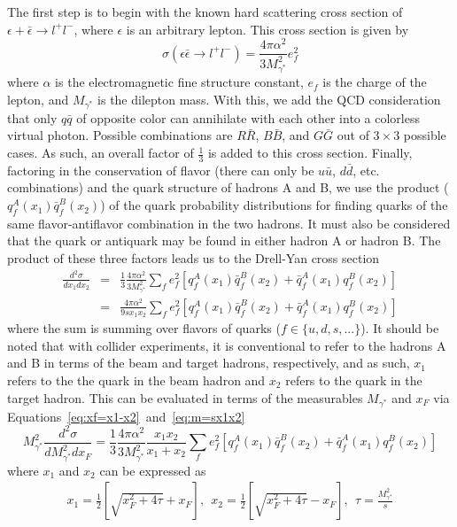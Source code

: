 The first step is to begin with the known hard scattering cross section of $\epsilon + \bar{\epsilon} \rightarrow l^+ l^-$, where $\epsilon$ is an arbitrary lepton. This cross section\cite{Halzen:1984mc} is given by
\begin{equation}
\sigma(\epsilon\bar{\epsilon}\rightarrow l^+l^-) = \frac{4 \pi \alpha^2}{3M_{\gamma^*}^2} e_f^2
\label{eq:annihilation-cross}
\end{equation}
where $\alpha$ is the electromagnetic fine structure constant, $e_f$ is the charge of the lepton, and $M_{\gamma^*}$ is the dilepton mass. With this, we add the QCD consideration that only $q\bar{q}$ of opposite color can annihilate with each other into a colorless virtual photon. Possible combinations are $R\bar{R}$, $B\bar{B}$, and $G\bar{G}$ out of $3\times 3$ possible cases. As such, an overall factor of $\frac{1}{3}$ is added to this cross section. Finally, factoring in the conservation of flavor (there can only be $u\bar{u}$, $d\bar{d}$, etc. combinations) and the quark structure of hadrons A and B,  we use the product ($q_f^A(x_1)\bar{q}_{f}^B(x_2)$) of the quark probability distributions for finding quarks of the same flavor-antiflavor combination in the two hadrons. It must also be considered that the quark or antiquark may be found in either hadron A or hadron B. The product of these three factors leads us to the Drell-Yan cross section\cite{Drell:1970wh}
\begin{eqnarray}
\frac{d^2\sigma}{dx_1dx_2}&=&\frac{1}{3}\frac{4\pi\alpha^2}{3M_{\gamma^*}^2}
\sum_{f}e_f^2[q_f^A(x_1)\bar{q}_f^B(x_2)+
\bar{q}_f^A(x_1)q_f^B(x_2)]\\
&=&\frac{4\pi\alpha^2}{9 s x_1 x_2}
\sum_{f}e_f^2[q_f^A(x_1)\bar{q}_f^B(x_2)+
\bar{q}_f^A(x_1)q_f^B(x_2)]
\label{eq:DY-cross}
\end{eqnarray}
where the sum is summing over flavors of quarks ($f\in\{u,d,s,...\}$). It should be noted that with collider experiments, it is conventional to refer to the hadrons A and B in terms of the beam and target hadrons, respectively, and as such, $x_1$ refers to the the quark in the beam hadron and $x_2$ refers to the quark in the target hadron. This can be evaluated in terms of the measurables $M_{\gamma^*}$ and $x_F$ via Equations~\ref{eq:xf=x1-x2}~and~\ref{eq:m=sx1x2}
\begin{equation}
M_{\gamma^*}^2 \frac{d^2\sigma}{dM_{\gamma^*}^2 dx_F} = 
\frac{1}{3}\frac{4\pi\alpha^2}{3M_{\gamma^*}^2}
\frac{x_1 x_2}{x_1 + x_2}
\sum_{f}e_f^2[q_f^A(x_1)\bar{q}_f^B(x_2)+
\bar{q}_f^A(x_1)q_f^B(x_2)]
\end{equation}
where $x_1$ and $x_2$ can be expressed as
\begin{eqnarray}
x_1 = \frac{1}{2}\left[\sqrt{x_F^2 + 4\tau} + x_F\right],\ \  
x_2 = \frac{1}{2}\left[\sqrt{x_F^2 + 4\tau} - x_F\right],\ \ 
\tau = \frac{M_{\gamma^*}^2}{s}
\end{eqnarray}


